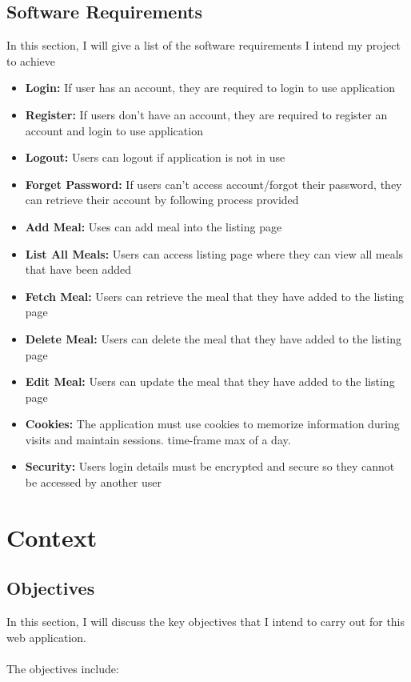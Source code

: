 \section{Software Requirements}

In this section, I will give a list of the software requirements I intend my project to achieve

\begin{itemize}
\item\textbf{Login: }If user has an account, they are required to login to use application
\item\textbf{Register: }If users don't have an account, they are required to register an account and login to use application
\item\textbf{Logout: }Users can logout if application is not in use
\item\textbf{Forget Password: }If users can't access account/forgot their password, they can retrieve their account by following process provided
\item\textbf{Add Meal: }Uses can add meal into the listing page
\item\textbf{List All Meals: }Users can access listing page where they can view all meals that have been added
\item\textbf{Fetch Meal: }Users can retrieve the meal that they have added to the listing page
\item\textbf{Delete Meal: }Users can delete the meal that they have added to the listing page
\item\textbf{Edit Meal: }Users can update the meal that they have added to the listing page
\item\textbf{Cookies: }The application must use cookies to memorize information during visits and maintain sessions.
time-frame max of a day.
\item\textbf{Security: }Users login details must be encrypted and secure so they cannot be accessed by another user
\end{itemize}

\chapter{Context}

\section {Objectives}

In this section, I will discuss the key objectives that I intend to carry out for this web application. \\ \\
The objectives include:

